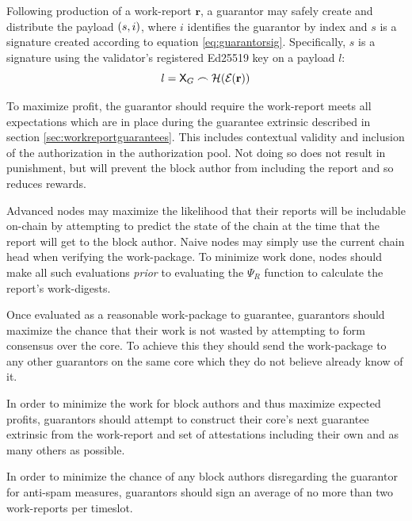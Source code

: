 Following production of a work-report $\mathbf{r}$, a guarantor may safely create and distribute the payload $\tup{s, i}$, where $i$ identifies the guarantor by index and $s$ is a signature created according to equation \ref{eq:guarantorsig}. Specifically, $s$ is a signature using the validator's registered Ed25519 key on a payload $l$:
\begin{equation}
  l = \Xguarantee \concat \blake{\encode{\mathbf{r}}}
\end{equation}

To maximize profit, the guarantor should require the work-report meets all expectations which are in place during the guarantee extrinsic described in section \ref{sec:workreportguarantees}. This includes contextual validity and inclusion of the authorization in the authorization pool. Not doing so does not result in punishment, but will prevent the block author from including the report and so reduces rewards.

Advanced nodes may maximize the likelihood that their reports will be includable on-chain by attempting to predict the state of the chain at the time that the report will get to the block author. Naive nodes may simply use the current chain head when verifying the work-package. To minimize work done, nodes should make all such evaluations \emph{prior} to evaluating the $\Psi_R$ function to calculate the report's work-digests.

Once evaluated as a reasonable work-package to guarantee, guarantors should maximize the chance that their work is not wasted by attempting to form consensus over the core. To achieve this they should send the work-package to any other guarantors on the same core which they do not believe already know of it.

In order to minimize the work for block authors and thus maximize expected profits, guarantors should attempt to construct their core's next guarantee extrinsic from the work-report and set of attestations including their own and as many others as possible.

In order to minimize the chance of any block authors disregarding the guarantor for anti-spam measures, guarantors should sign an average of no more than two work-reports per timeslot.
